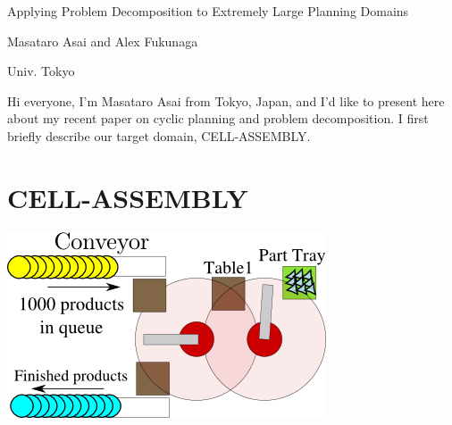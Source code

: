 \begin{outline-text-1}
\begin{xlarge}
\begin{center}
Applying Problem Decomposition to Extremely Large Planning Domains
\end{center}
\end{xlarge}

\begin{center}
\begin{smaller}
Masataro Asai and Alex Fukunaga

Univ. Tokyo
\end{smaller}
\end{center}

\begin{resume}
Hi everyone, I'm Masataro Asai from Tokyo, Japan,
and I'd like to present here about my recent paper on
cyclic planning and problem decomposition.
I first briefly describe our target domain, CELL-ASSEMBLY.
\end{resume}
\end{outline-text-1}

\section{CELL-ASSEMBLY}
\label{sec-1}

\includegraphics[width=.9\linewidth]{img/model2a.png}

